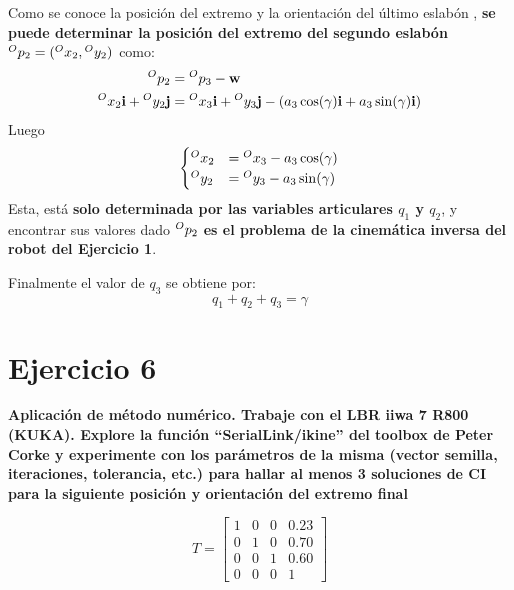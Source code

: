 \documentclass[a4paper,12pt]{article}
\begin{document}
Como se conoce la posición del extremo y la orientación del último eslabón , \textbf{se puede determinar la posición del extremo del segundo eslabón} $\prescript{O}{}{p_2} = (\prescript{O}{}{x_2}, \prescript{O}{}{y_2})$ como:
\begin{align*}
    \prescript{O}{}{p_2} &= \prescript{O}{}{p_3} - \mathbf{w}\\
    \prescript{O}{}{x_2}\mathbf{i} + \prescript{O}{}{y_2}\mathbf{j} &= \prescript{O}{}{x_3}\mathbf{i} + \prescript{O}{}{y_3}\mathbf{j} - \left(a_3\cos(\gamma)\mathbf{i} + a_3\sin(\gamma)\mathbf{i}\right)\\
\end{align*}
Luego
\begin{align*}
    \begin{cases}
        \prescript{O}{}{x_2} &= \prescript{O}{}{x_3} - a_3\cos(\gamma)\\
        \prescript{O}{}{y_2} &= \prescript{O}{}{y_3} - a_3\sin(\gamma)
    \end{cases}
\end{align*}
Esta, está \textbf{solo determinada por las variables articulares $q_1$ y $q_2$}, y encontrar sus valores dado $\prescript{O}{}{p_2}$ \textbf{es el problema de la cinemática inversa del robot del Ejercicio 1}.

Finalmente el valor de $q_3$ se obtiene por:
\[
    q_1 + q_2 + q_3 = \gamma
\]

\section{Ejercicio 6}
\textbf{Aplicación de método numérico. Trabaje con el LBR iiwa 7 R800 (KUKA). Explore la
función ``SerialLink/ikine'' del toolbox de Peter Corke y experimente con los parámetros de la
misma (vector semilla, iteraciones, tolerancia, etc.) para hallar al menos 3 soluciones de CI
para la siguiente posición y orientación del extremo final}

\begin{equation*}
    T = 
    \begin{bmatrix}
        1 & 0 & 0 & 0.23\\
        0 & 1 & 0 & 0.70\\
        0 & 0 & 1 & 0.60\\
        0 & 0 & 0 & 1
    \end{bmatrix}
\end{equation*}
\end{document}
